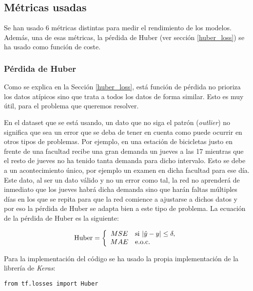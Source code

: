 \subsection{Métricas usadas}
Se han usado 6 métricas distintas para medir el rendimiento de los modelos. Además, una de esas métricas, la pérdida de Huber (ver sección \ref{huber_loss}) se ha usado como función de coste.

\subsubsection{Pérdida de Huber}

Como se explica en la Sección \ref{huber_loss}, está función de pérdida no prioriza los datos atípicos sino que trata a todos los datos de forma similar. Esto es muy útil, para el problema que queremos resolver.
\newline

En el dataset que se está usando, un dato que no siga el patrón (\textit{outlier}) no significa que sea un error que se deba de tener en cuenta como puede ocurrir en otros tipos de problemas. Por ejemplo, en una estación de bicicletas justo en frente de una facultad recibe una gran demanda un jueves a las 17 mientras que el resto de jueves no ha tenido tanta demanda para dicho intervalo. Esto se debe a un acontecimiento único, por ejemplo un examen en dicha facultad para ese día. Este dato, al ser un dato válido y no un error como tal, la red no aprenderá de inmediato que los jueves habrá dicha demanda sino que harán faltas múltiples días en los que se repita para que la red comience a ajustarse a dichos datos y por eso la pérdida de Huber se adapta bien a este tipo de problema. La ecuación de la pérdida de Huber es la siguiente:

\begin{equation}
\centering
    \begin{split}
    \text{Huber} = \left\{ 
        \begin{array}{cl} 
            MSE & \text{si }|\hat{y}-y| \le \delta, \\
            MAE & \text{e.o.c.}
        \end{array}\right.
    \end{split}
\end{equation}

Para la implementación del código se ha usado la propia implementación de la librería de \textit{Keras}:

\begin{verbatim}
from tf.losses import Huber
\end{verbatim}


